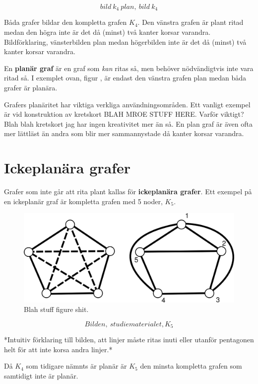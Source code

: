 \documentclass[a4paper,11pt]{article}
\begin{document}
$$bild\ k_4\ plan,\ bild\ k_4$$

Båda grafer bildar den kompletta grafen $K_4$. Den vänstra grafen är plant ritad medan den högra inte är det då (minst) två kanter korsar varandra.
Bildförklaring, vänsterbilden plan medan högerbilden inte är det då (minst) två kanter korsar varandra.

En \textbf{planär graf} är en graf som \emph{kan} ritas så, men behöver nödvändigtvis inte vara ritad så. I exemplet ovan, figur \cite{somefig}, är endast den vänstra grafen plan medan båda grafer är planära.

Grafers planäritet har viktiga verkliga användningsområden. Ett vanligt exempel är vid konstruktion av kretskort BLAH MROE STUFF HERE.
Varför viktigt? Blah blah kretskort jag har ingen kreativitet mer än så. En plan graf är även ofta mer lättläst än andra som blir mer sammannystade då kanter korsar varandra.

\section*{Ickeplanära grafer}

Grafer som inte går att rita plant kallas för \textbf{ickeplanära grafer}. Ett exempel på en ickeplanär graf är kompletta grafen med 5 noder, $K_5$.

\begin{figure}[!ht]
	\begin{center}
		\includegraphics{fig5}
		\caption{Blah stuff figure shit.}
		\label{fig5}
	\end{center}
\end{figure}
\FloatBarrier

$$Bilden,\ studiematerialet, K_5$$

*Intuitiv förklaring till bilden, att linjer måste ritas inuti eller utanför pentagonen helt för att inte korsa andra linjer.*

Då $K_4$ som tidigare nämnts är planär är $K_5$ den minsta kompletta grafen som samtidigt inte är planär.
\end{document}
